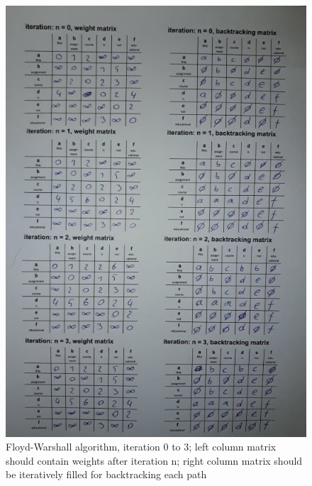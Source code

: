 \documentclass{article}
\begin{document}
\begin{enumerate}[label = (\alph*)]
\begin{figure}[H]
		\item
        \centering
        \includegraphics[width=1.0\textwidth]{./figures/floyd1.jpg}
        \caption{Floyd-Warshall algorithm, iteration 0 to 3; left column matrix should contain weights after iteration n; right column matrix should be iteratively filled for backtracking each path}
        \label{fig:wfst_charts_1}
    \end{figure} 
    

\end{enumerate}
\end{document}
